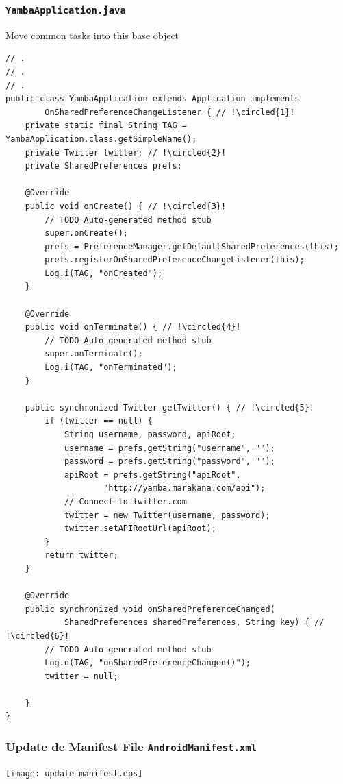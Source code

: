 \begin{frame}
\frametitle{\texttt{YambaApplication.java}}
Move common tasks into this base object

\lstset{language=java, style=eclipse, breaklines=true, tabsize=2}
\begin{lstlisting}[caption=src/com/artemisa/yamba/YambaApplication.java, basicstyle=\tiny,escapechar=!]
// .
// .
// .
public class YambaApplication extends Application implements
		OnSharedPreferenceChangeListener { // !\circled{1}!
	private static final String TAG = YambaApplication.class.getSimpleName();
	private Twitter twitter; // !\circled{2}!
	private SharedPreferences prefs;

	@Override
	public void onCreate() { // !\circled{3}!
		// TODO Auto-generated method stub
		super.onCreate();
		prefs = PreferenceManager.getDefaultSharedPreferences(this);
		prefs.registerOnSharedPreferenceChangeListener(this);
		Log.i(TAG, "onCreated");
	}

	@Override
	public void onTerminate() { // !\circled{4}!
		// TODO Auto-generated method stub
		super.onTerminate();
		Log.i(TAG, "onTerminated");
	}

	public synchronized Twitter getTwitter() { // !\circled{5}!
		if (twitter == null) {
			String username, password, apiRoot;
			username = prefs.getString("username", "");
			password = prefs.getString("password", "");
			apiRoot = prefs.getString("apiRoot",
					"http://yamba.marakana.com/api");
			// Connect to twitter.com
			twitter = new Twitter(username, password);
			twitter.setAPIRootUrl(apiRoot);
		}
		return twitter;
	}

	@Override
	public synchronized void onSharedPreferenceChanged(
			SharedPreferences sharedPreferences, String key) { // !\circled{6}!
		// TODO Auto-generated method stub
		Log.d(TAG, "onSharedPreferenceChanged()");
		twitter = null;

	}
}
\end{lstlisting}
\end{frame}
\begin{frame}[containsverbatim]
\frametitle{Update de Manifest File \texttt{AndroidManifest.xml}}
\centering
\texttt{[image: update-manifest.eps]}
\end{frame}
